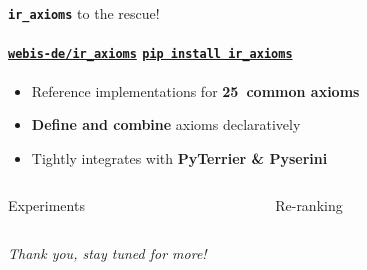 \documentclass[english,xcolor=x11names]{beamer}
\newcommand{\bibliographyframe}{
\begin{frame}[t,allowframebreaks]{References}
	\begin{thebibliography}{10}
		\beamertemplatebookbibitems
		\printbibliography
	\end{thebibliography}
\end{frame}
}
\newcommand{\thankyouname}{Thank you, stay tuned for more!}
\newcommand{\thankyou}{\vfill\hfill\emph{\thankyouname}}
\begin{document}
\begin{frame}{\textbf{\texttt{ir\_axioms}} to the rescue!}
  \framesubtitle{%
    \scriptsize%
    \href{https://github.com/webis-de/ir_axioms}{\enskip\texttt{webis-de/ir\_axioms}}
    \quad
    \href{https://pypi.org/project/ir_axioms/}{\enskip\texttt{pip install ir\_axioms}}
  }
  \begin{itemize}
    \item Reference implementations for \textbf{25~common axioms}
    \item \textbf{Define and combine} axioms declaratively
    \item Tightly integrates with \textbf{PyTerrier \& Pyserini}
  \end{itemize}
  \begin{columns}[t]
    \begin{column}{0.5\textwidth}
      \begin{block}{Experiments}
        
      \end{block}
    \end{column}
    \begin{column}{0.5\textwidth}
      \begin{block}{Re-ranking}
        
      \end{block}
    \end{column}
  \end{columns}
  \thankyou
\end{frame}

\end{document}
